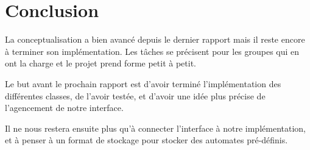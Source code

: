 \documentclass[11pt]{article}
\begin{document}
\section{Conclusion}

La conceptualisation a bien avancé depuis le dernier rapport mais il reste encore à terminer son implémentation. Les tâches se précisent pour les groupes qui en ont la charge et le projet prend forme petit à petit. 

\bigskip

Le but avant le prochain rapport est d'avoir terminé l'implémentation des différentes classes, de l'avoir testée, et d'avoir une idée plus précise de l'agencement de notre interface.

\bigskip

Il ne nous restera ensuite plus qu'à connecter l'interface à notre implémentation, et à penser à un format de stockage pour stocker des automates pré-définis.
\end{document}
